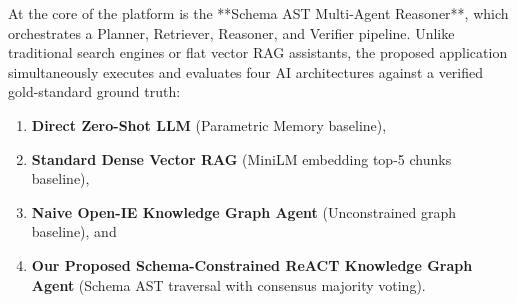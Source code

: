 \documentclass[12pt,a4paper,oneside]{report}
\begin{document}
At the core of the platform is the **Schema AST Multi-Agent Reasoner**, which orchestrates a Planner, Retriever, Reasoner, and Verifier pipeline. Unlike traditional search engines or flat vector RAG assistants, the proposed application simultaneously executes and evaluates four AI architectures against a verified gold-standard ground truth:
\begin{enumerate}
    \item \textbf{Direct Zero-Shot LLM} (Parametric Memory baseline),
    \item \textbf{Standard Dense Vector RAG} (MiniLM embedding top-5 chunks baseline),
    \item \textbf{Naive Open-IE Knowledge Graph Agent} (Unconstrained graph baseline), and
    \item \textbf{Our Proposed Schema-Constrained ReACT Knowledge Graph Agent} (Schema AST traversal with consensus majority voting).
\end{enumerate}
\end{document}
